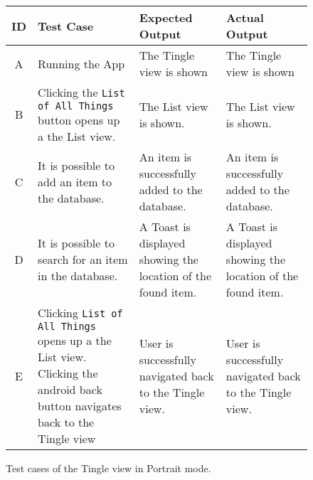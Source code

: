 \begin{figure}[H]
	\renewcommand*{\arraystretch}{1.5} %
	\begin{tabular}{| c | p{3.5cm} | p{3.5cm} | p{3.5cm} |}
		\hline
		{\textbf{ID} } & {\textbf{Test Case} } & {\textbf{Expected Output}} & {\textbf {Actual Output}} \\\hline\hline
		A & Running the App & The Tingle view is shown & The Tingle view is shown  \\ \hline
		B &	Clicking the \texttt{List of All Things} button opens up a the List view. & The List view is shown. & The List view is shown. \\ \hline
		C & It is possible to add an item to the database. & An item is successfully added to the database. & An item is successfully added to the database. \\ \hline
		D & It is possible to search for an item in the database. & A Toast is displayed showing the location of the found item. & A Toast is displayed showing the location of the found item. \\ \hline
		E & Clicking \texttt{List of All Things} opens up a the List view. 
     Clicking the android back button navigates back to the Tingle view & User is successfully navigated back to the Tingle view. & User is successfully navigated back to the Tingle view.  \\ \hline
	\end{tabular}
	
	\caption{Test cases of the Tingle view in Portrait mode.}
	\label{tab:test-cases-tingle-portrait}
\end{figure}


